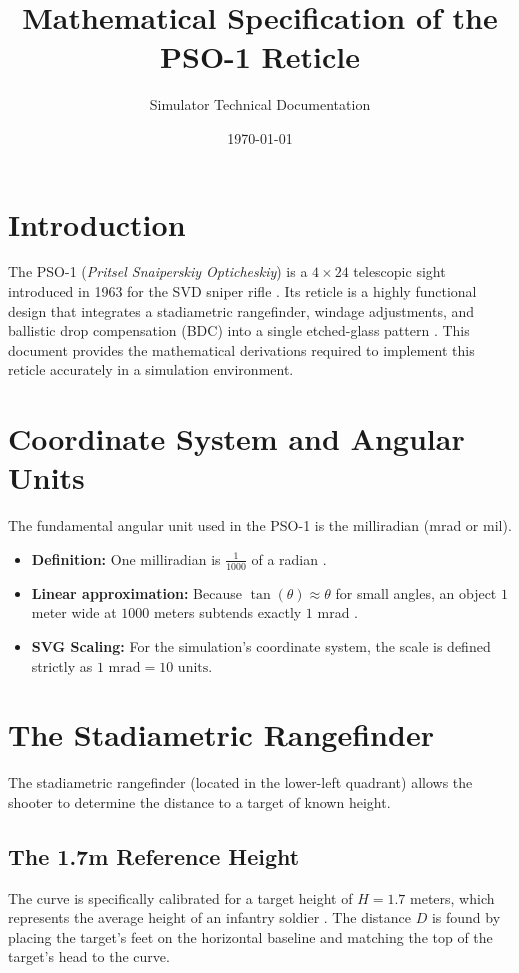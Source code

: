 \documentclass[11pt,a4paper]{article}
\title{\textbf{Mathematical Specification of the PSO-1 Reticle}}
\author{Simulator Technical Documentation}
\date{\today}
\begin{document}
\maketitle

\section{Introduction}
The PSO-1 (\textit{Pritsel Snaiperskiy Opticheskiy}) is a $4\times24$ telescopic sight introduced in 1963 for the SVD sniper rifle \cite{wiki:pso1}. Its reticle is a highly functional design that integrates a stadiametric rangefinder, windage adjustments, and ballistic drop compensation (BDC) into a single etched-glass pattern \cite{wiki:pso1}. This document provides the mathematical derivations required to implement this reticle accurately in a simulation environment.

\section{Coordinate System and Angular Units}
The fundamental angular unit used in the PSO-1 is the milliradian (mrad or mil).
\begin{itemize}
    \item \textbf{Definition:} One milliradian is $\frac{1}{1000}$ of a radian \cite{wiki:mrad}.
    \item \textbf{Linear approximation:} Because $\tan(\theta) \approx \theta$ for small angles, an object $1$ meter wide at $1000$ meters subtends exactly $1$ mrad \cite{wiki:mrad}.
    \item \textbf{SVG Scaling:} For the simulation's coordinate system, the scale is defined strictly as $1 \text{ mrad} = 10 \text{ units}$.
\end{itemize}

\section{The Stadiametric Rangefinder}
The stadiametric rangefinder (located in the lower-left quadrant) allows the shooter to determine the distance to a target of known height. 

\subsection{The 1.7m Reference Height}
The curve is specifically calibrated for a target height of $H = 1.7$ meters, which represents the average height of an infantry soldier \cite{wiki:pso1}. The distance $D$ is found by placing the target's feet on the horizontal baseline and matching the top of the target's head to the curve.
\end{document}
